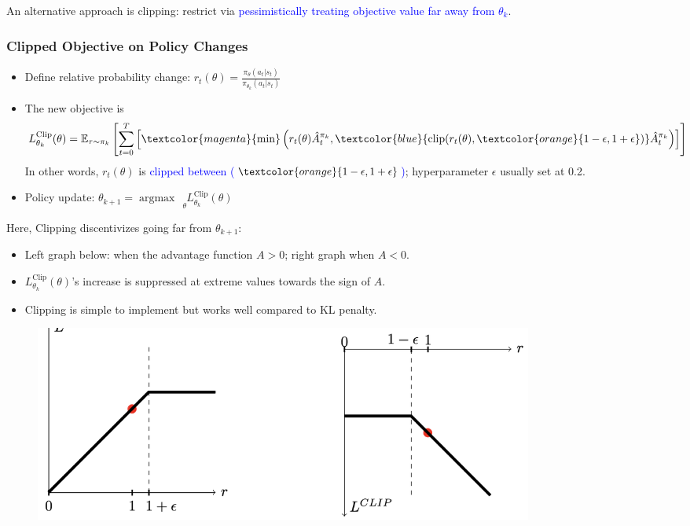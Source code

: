 \documentclass{article}
\begin{document}
An alternative approach is clipping: restrict via \textcolor{blue}{pessimistically treating objective value far away from $\theta_k$}.
\begin{thmbox}
    \subsubsection*{Clipped Objective on Policy Changes}
    \begin{itemize}
    \item Define relative probability change: $r_{t}(\theta) = \frac{\pi_{\theta} (a_t | s_t)}{\pi_{\theta_k} (a_t | s_t)}$ 
    \item The new objective is
        \begin{equation*}
            L_{\theta_{k}}^{\text{Clip}} (\theta) 
            = \mathbb{E}_{\tau \sim \pi_{k}} \left[ \sum_{t = 0}^{T} \left[ \textcolor{magenta}{\min} \left( r_{t} (\theta) \hat{A}_t^{\pi_{k}}, \textcolor{blue}{\text{clip}(r_{t}(\theta), \textcolor{orange}{1 - \epsilon, 1 + \epsilon})} \hat{A}_t^{\pi_{k}} \right) \right] \right]
        \end{equation*}
        In other words, $r_{t} (\theta)$ is \textcolor{blue}{clipped between ($\textcolor{orange}{1 - \epsilon, 1 + \epsilon}$)}; hyperparameter $\epsilon$ usually set at 0.2.
    \item Policy update: $\theta_{k+1} = \mathop{\arg\max} ~~~ \limits_{\theta} L_{\theta_{k}}^{\text{Clip}} (\theta)$
    \end{itemize}
\end{thmbox}

Here, Clipping discentivizes going far from $\theta_{k+1}$:
\begin{itemize}
\item Left graph below: when the advantage function $A > 0$; right graph when $A < 0$.
\item $L_{\theta_{k}}^{\text{Clip}} (\theta)$'s increase is suppressed at extreme values towards the sign of $A$.
\item Clipping is simple to implement but works well compared to KL penalty.
\end{itemize}

\begin{figure}
    \includegraphics[width=0.8\textwidth]{lec6-clipped-values.png}
\end{figure}
\end{document}
